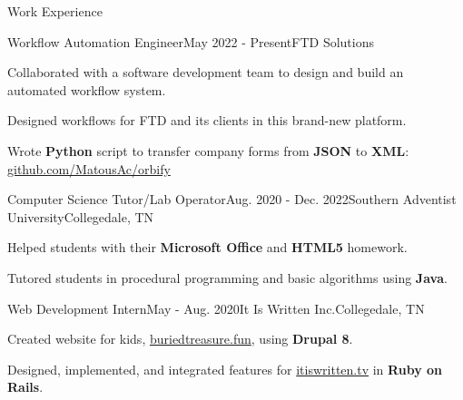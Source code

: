 \begin{rSection}{Work Experience}
	\begin{job}{Workflow Automation Engineer}{May 2022 - Present}{FTD Solutions}{}
		\item Collaborated with a software development team to design and build an automated workflow system.
		\item Designed workflows for FTD and its clients in this brand-new platform.
		\item Wrote {\bf Python} script to transfer company forms from {\bf JSON} to {\bf XML}: \href{https://github.com/MatousAc/orbify}{github.com/MatousAc/orbify}
	\end{job}
	
	\begin{job}{Computer Science Tutor/Lab Operator}{Aug. 2020 - Dec. 2022}{Southern Adventist University}{Collegedale, TN}{}
   \item Helped students with their {\bf Microsoft Office} and {\bf HTML5} homework. 
	 \item Tutored students in procedural programming and basic algorithms using {\bf Java}.
	\end{job}


	\begin{job}{Web Development Intern}{May - Aug. 2020}{It Is Written Inc.}{Collegedale, TN}
		\item Created website for kids, \href{https://buriedtreasure.fun/}{buriedtreasure.fun}, using {\bf Drupal 8}.
		\item Designed, implemented, and integrated features for \href{https://itiswritten.tv}{itiswritten.tv} in {\bf Ruby on Rails}.
	\end{job}
\end{rSection}
